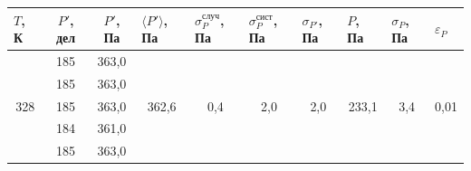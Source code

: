 \documentclass[a4paper,12pt]{article}
\begin{document}
\begin{table}[H]
\begin{tabular}{|c|c|c|c|c|c|c|c|c|c|}
\hline
\multicolumn{1}{|l|}{$ T $, К} & $ P' $, дел & $ P' $, Па & \multicolumn{1}{l|}{$ \langle P' \rangle $, Па} & \multicolumn{1}{l|}{$\sigma_P^{случ}$, Па} & \multicolumn{1}{l|}{$\sigma_P^{сист}$, Па} & \multicolumn{1}{l|}{$ \sigma_{P'} $, Па} & \multicolumn{1}{l|}{$ P $, Па} & \multicolumn{1}{l|}{$ \sigma_P $, Па} & \multicolumn{1}{l|}{$\varepsilon_P$} \\ \hline
\multirow{5}{*}{328}           & 185         & 363,0      & \multirow{5}{*}{362,6}                          & \multirow{5}{*}{0,4}                       & \multirow{5}{*}{2,0}                       & \multirow{5}{*}{2,0}                     & \multirow{5}{*}{233,1}         & \multirow{5}{*}{3,4}                  & \multirow{5}{*}{0,01}                \\ \cline{2-3}
                               & 185         & 363,0      &                                                 &                                            &                                            &                                          &                                &                                       &                                      \\ \cline{2-3}
                               & 185         & 363,0      &                                                 &                                            &                                            &                                          &                                &                                       &                                      \\ \cline{2-3}
                               & 184         & 361,0      &                                                 &                                            &                                            &                                          &                                &                                       &                                      \\ \cline{2-3}
                               & 185         & 363,0      &                                                 &                                            &                                            &                                          &                                &                                       &                                      \\ \hline
\end{tabular}
\end{table}
\end{document}
